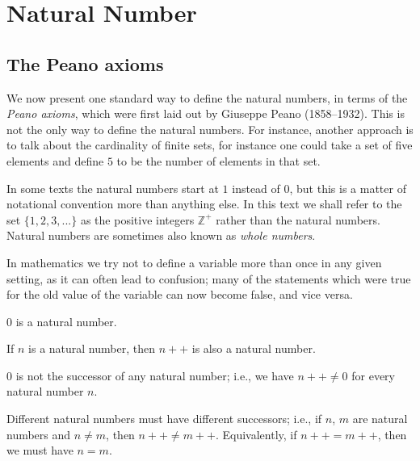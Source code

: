 \chapter{Natural Number}

\section{The Peano axioms}

\begin{note}
We now present one standard way to define the natural numbers, in terms of the \emph{Peano axioms}, which were first laid out by Giuseppe Peano (1858–1932).
This is not the only way to define the natural numbers.
For instance, another approach is to talk about the cardinality of finite sets, for instance one could take a set of five elements and define \(5\) to be the number of elements in that set.
\end{note}

\begin{note}
In some texts the natural numbers start at \(1\) instead of \(0\), but this is a matter of notational convention more than anything else.
In this text we shall refer to the set \(\{1, 2, 3,...\}\) as the positive integers \(\mathds{Z}^+\) rather than the natural numbers.
Natural numbers are sometimes also known as \emph{whole numbers}.
\end{note}

\begin{note}
In mathematics we try not to define a variable more than once in any given setting, as it can often lead to confusion;
many of the statements which were true for the old value of the variable can now become false, and vice versa.
\end{note}

\begin{axiom}\label{2.1}
\(0\) is a natural number.
\end{axiom}

\begin{axiom}\label{2.2}
If \(n\) is a natural number, then \(n++\) is also a natural number.
\end{axiom}

\begin{axiom}\label{2.3}
\(0\) is not the successor of any natural number;
i.e., we have \(n++ \neq 0\) for every natural number \(n\).
\end{axiom}

\begin{axiom}\label{2.4}
Different natural numbers must have different successors;
i.e., if \(n\), \(m\) are natural numbers and \(n \neq m\), then \(n++ \neq m++\).
Equivalently, if \(n++ = m++\), then we must have \(n = m\).
\end{axiom}

